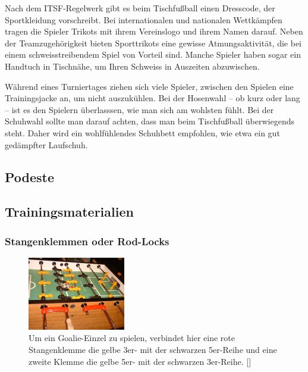 Nach dem ITSF-Regelwerk gibt es beim Tischfußball einen Dresscode, der Sportkleidung vorschreibt. 
Bei internationalen und nationalen Wettkämpfen tragen die Spieler Trikots mit ihrem Vereinslogo und ihrem Namen darauf. 
Neben der Teamzugehörigkeit bieten Sporttrikots eine gewisse Atmungsaktivität, die bei einem schweisstreibendem Spiel von Vorteil sind. 
Manche Spieler haben sogar ein Handtuch in Tischnähe, um Ihren Schweiss in Auszeiten abzuwischen.

Während eines Turniertages ziehen sich viele Spieler, zwischen den Spielen eine Trainingsjacke an, um nicht auszukühlen.
Bei der Hosenwahl -- ob kurz oder lang -- ist es den Spielern überlasssen, wie man sich am wohlsten fühlt. 
Bei der Schuhwahl sollte man darauf achten, dass man beim Tischfußball überwiegends steht. 
Daher wird ein wohlfühlendes Schuhbett empfohlen, wie etwa ein gut gedämpfter Laufschuh.  

\subsection{Podeste}
\label{tisch:zubehoer:podeste}



\subsection{Trainingsmaterialien}
\label{tisch:zubehoer:training}

\subsubsection{Stangenklemmen oder Rod-Locks}
\label{tisch:zubehoer:training:rodlock}

\begin{figure}
    \centering 
        \includegraphics[width=0.38\textwidth]{img/rodlock_goalie.jpg} 
        \caption{Um ein Goalie-Einzel zu spielen, verbindet hier eine rote Stangenklemme die gelbe 3er- mit der schwarzen 5er-Reihe und eine zweite Klemme die gelbe 5er- mit der schwarzen 3er-Reihe. [\cite{www:rod-lock}]} 
        \label{fig:rod-lock} 
\end{figure}

